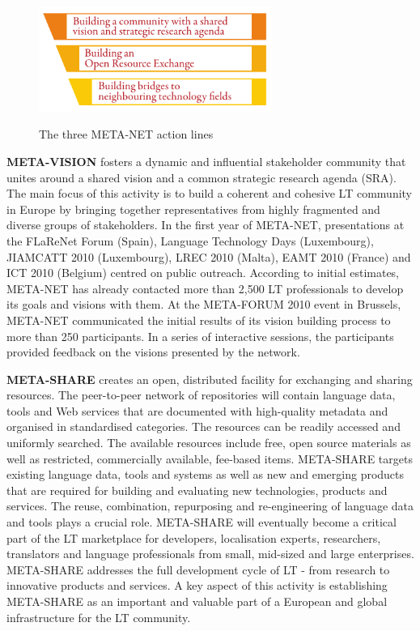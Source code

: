\begin{multicols}{2}
\begin{figure}[!ht]
\begin{center}
  \includegraphics[width=3.0in]{../_media/meta_3lines}\\
  \caption{The three META-NET action lines}
  \label{fig:metanetactionlines}
\end{center}
\end{figure}

\textbf{META-VISION} fosters a dynamic and influential stakeholder community that unites around a shared vision and a common strategic research agenda (SRA). The main focus of this activity is to build a coherent and cohesive LT community in Europe by bringing together representatives from highly fragmented and diverse groups of stakeholders. In the first year of META-NET, presentations at the FLaReNet Forum (Spain), Language Technology Days (Luxembourg), JIAMCATT 2010 (Luxembourg), LREC 2010 (Malta), EAMT 2010 (France) and ICT 2010 (Belgium) centred on public outreach. According to initial estimates, META-NET has already contacted more than 2,500 LT professionals to develop its goals and visions with them. At the META-FORUM 2010 event in Brussels, META-NET communicated the initial results of its vision building process to more than 250 participants. In a series of interactive sessions, the participants provided feedback on the visions presented by the network. 

\textbf{META-SHARE} creates an open, distributed facility for exchanging and sharing resources. The peer-to-peer network of repositories will contain language data, tools and Web services that are documented with high-quality metadata and organised in standardised categories. The resources can be readily accessed and uniformly searched. The available resources include free, open source materials as well as restricted, commercially available, fee-based items. META-SHARE targets existing language data, tools and systems as well as new and emerging products that are required for building and evaluating new technologies, products and services. The reuse, combination, repurposing and re-engineering of language data and tools plays a crucial role. META-SHARE will eventually become a critical part of the LT marketplace for developers, localisation experts, researchers, translators and language professionals from small, mid-sized and large enterprises. META-SHARE addresses the full development cycle of LT - from research to innovative products and services. A key aspect of this activity is establishing META-SHARE as an important and valuable part of a European and global infrastructure for the LT community. 


\end{multicols}
